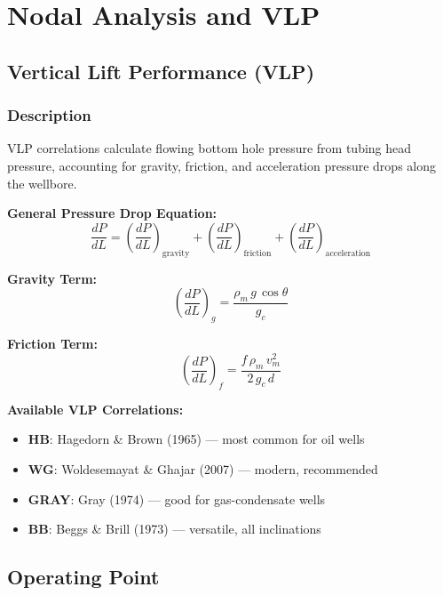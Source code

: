 \documentclass[11pt,a4paper]{article}
\newcommand{\symitem}[2]{\item \textbf{#1}: #2}
\begin{document}
\section{Nodal Analysis and VLP}

\subsection{Vertical Lift Performance (VLP)}

\subsubsection{Description}
VLP correlations calculate flowing bottom hole pressure from tubing head pressure, accounting for gravity, friction, and acceleration pressure drops along the wellbore.

\begin{tcolorbox}[colback=formulabox,colframe=black!75]
\textbf{General Pressure Drop Equation:}
\begin{equation}
\frac{dP}{dL} = \left(\frac{dP}{dL}\right)_{\text{gravity}} + \left(\frac{dP}{dL}\right)_{\text{friction}} + \left(\frac{dP}{dL}\right)_{\text{acceleration}}
\end{equation}

\textbf{Gravity Term:}
\begin{equation}
\left(\frac{dP}{dL}\right)_g = \frac{\rho_m \, g \, \cos\theta}{g_c}
\end{equation}

\textbf{Friction Term:}
\begin{equation}
\left(\frac{dP}{dL}\right)_f = \frac{f \, \rho_m \, v_m^2}{2 \, g_c \, d}
\end{equation}
\end{tcolorbox}

\textbf{Available VLP Correlations:}
\begin{itemize}[leftmargin=2cm]
\symitem{HB}{Hagedorn \& Brown (1965) --- most common for oil wells}
\symitem{WG}{Woldesemayat \& Ghajar (2007) --- modern, recommended}
\symitem{GRAY}{Gray (1974) --- good for gas-condensate wells}
\symitem{BB}{Beggs \& Brill (1973) --- versatile, all inclinations}
\end{itemize}

\subsection{Operating Point}
\end{document}
